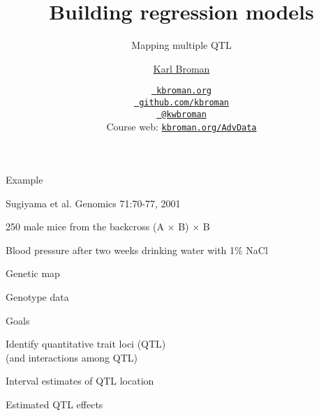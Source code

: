 \documentclass[aspectratio=169,12pt,t]{beamer}
\title{Building regression models}
\subtitle{Mapping multiple QTL}
\author{\href{https://kbroman.org}{Karl Broman}}
\institute{Biostatistics \& Medical Informatics, UW{\textendash}Madison}
\date{\href{https://kbroman.org}{\tt \scriptsize \color{foreground} kbroman.org}
\\[-4pt]
\href{https://github.com/kbroman}{\tt \scriptsize \color{foreground} github.com/kbroman}
\\[-4pt]
\href{https://twitter.com/kwbroman}{\tt \scriptsize \color{foreground} @kwbroman}
\\[-4pt]
{\scriptsize Course web: \href{https://kbroman.org/AdvData}{\tt kbroman.org/AdvData}}
}
\begin{document}
{
 }







\begin{frame}{Example}

\footnotesize
Sugiyama et al. Genomics 71:70-77, 2001

\bi
\item 250 male mice from the backcross (A $\times$ B) $\times$ B
\item Blood pressure after two weeks drinking water with 1\% NaCl
\ei


\note{
}
\end{frame}







\begin{frame}[c]{Genetic map}


\note{
}
\end{frame}





\begin{frame}[c]{Genotype data}


\note{
}
\end{frame}





\begin{frame}{Goals}

\bbi
\item Identify quantitative trait loci (QTL) \\[6pt]
   {\lolit   (and interactions among QTL)}
\item Interval estimates of QTL location
\item Estimated QTL effects
\ei

\note{
}
\end{frame}
\end{document}
